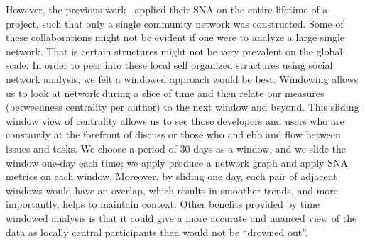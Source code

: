 \documentclass[10pt, conference, compsocconf]{IEEEtran}
\begin{document}
However, the previous work~\cite{ACM:ashish,MSR:christ} applied their
SNA on the entire lifetime of a project, such that only a single community network was constructed. 
Some of these collaborations might not be evident if one were to
analyze a large single network.
That is certain structures might not be very prevalent on the global scale.
In order to peer into these local self organized structures using
social network analysis, we felt a windowed approach would be
best. 
Windowing allows us to look at network during a slice of time
and then relate our measures (betweenness centrality per author) to
the next window and beyond. 
This sliding window view of centrality allows us to see those
developers and users who are constantly at the forefront of discuss or
those who and ebb and flow between issues and tasks.
We choose a period of 30 days as a window, and we slide the window one-day each time; we
apply produce a network graph and apply SNA metrics on each window.
Moreover, by sliding one day, each pair of adjacent windows would have
an overlap, which results in smoother trends, and more importantly,
helps to maintain context. 
Other benefits provided by time windowed analysis is that it could
give a more accurate and nuanced view of the data as 
locally central participants then would not be 
``drowned out''.





\end{document}
